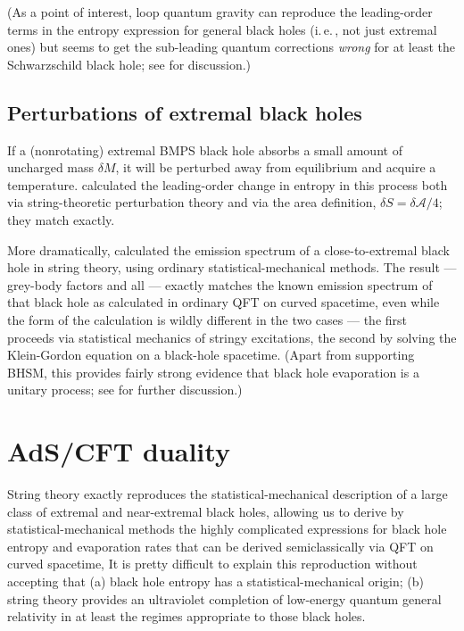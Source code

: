 \documentclass[12pt]{article}
\newcommand{\iec}{\mbox{i.\,e.\,}}
\newcommand{\mc}[1]{\ensuremath{\mathcal{#1}}}
\begin{document}
(As a point of interest, loop quantum gravity can reproduce the leading-order terms in the entropy expression for general black holes (\iec, not just extremal ones) but seems to get the sub-leading quantum corrections \emph{wrong} for at least the Schwarzschild black hole; see  for discussion.)

\subsection{Perturbations of extremal black holes}\label{string-nonextremal}

If a (nonrotating) extremal BMPS black hole absorbs a small amount of uncharged mass $\delta M$, it will be perturbed away from equilibrium and acquire a temperature.  calculated the leading-order change in entropy in this process both via string-theoretic perturbation theory and via the area definition, $\delta S = \delta \mc{A}/4$; they match exactly. 

More dramatically,  calculated the emission spectrum of a close-to-extremal black hole in string theory, using ordinary statistical-mechanical methods. The result --- grey-body factors and all --- exactly matches the known emission spectrum of that black hole as calculated in ordinary QFT on curved spacetime, even while the form of the calculation is wildly different in the two cases --- the first proceeds via statistical mechanics of stringy excitations, the second by solving the Klein-Gordon equation on a black-hole spacetime. (Apart from supporting BHSM, this provides fairly strong evidence that black hole evaporation is a unitary process; see  for further discussion.)

\section{AdS/CFT duality}\label{adscft}

String theory exactly reproduces the statistical-mechanical description of a large class of extremal and near-extremal black holes, allowing us to derive by statistical-mechanical methods the highly complicated expressions for black hole entropy and evaporation rates that can be derived semiclassically via QFT on curved spacetime, It is pretty difficult to explain this reproduction without accepting that (a) black hole entropy has a statistical-mechanical origin; (b) string theory provides an ultraviolet completion of low-energy quantum general relativity in at least the regimes appropriate to those black holes.
\end{document}
